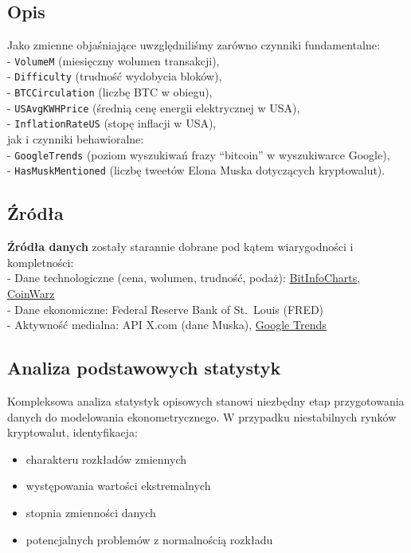 \documentclass[
  11pt,
]{article}
\begin{document}
\subsection{Opis}\label{opis}

Jako zmienne objaśniające uwzględniliśmy zarówno czynniki
fundamentalne:\\
- \texttt{VolumeM} (miesięczny wolumen transakcji),\\
- \texttt{Difficulty} (trudność wydobycia bloków),\\
- \texttt{BTCCirculation} (liczbę BTC w obiegu),\\
- \texttt{USAvgKWHPrice} (średnią cenę energii elektrycznej w USA),\\
- \texttt{InflationRateUS} (stopę inflacji w USA),\\
jak i czynniki behawioralne:\\
- \texttt{GoogleTrends} (poziom wyszukiwań frazy ``bitcoin'' w
wyszukiwarce Google),\\
- \texttt{HasMuskMentioned} (liczbę tweetów Elona Muska dotyczących
kryptowalut).

\subsection{Źródła}\label{ux17aruxf3dux142a}

\textbf{Źródła danych} zostały starannie dobrane pod kątem wiarygodności
i kompletności:\\
- Dane technologiczne (cena, wolumen, trudność, podaż):
\href{https://bitinfocharts.com}{BitInfoCharts},
\href{https://www.coinwarz.com/mining/bitcoin/difficulty-chart}{CoinWarz}\\
- Dane ekonomiczne: Federal Reserve Bank of St.~Louis (FRED)\\
- Aktywność medialna: API X.com (dane Muska),
\href{https://trends.google.com}{Google Trends}

\subsection{Analiza podstawowych
statystyk}\label{analiza-podstawowych-statystyk}

Kompleksowa analiza statystyk opisowych stanowi niezbędny etap
przygotowania danych do modelowania ekonometrycznego. W przypadku
niestabilnych rynków kryptowalut, identyfikacja:

\begin{itemize}
\item
  charakteru rozkładów zmiennych
\item
  występowania wartości ekstremalnych
\item
  stopnia zmienności danych
\item
  potencjalnych problemów z normalnością rozkładu
\end{itemize}
\end{document}
